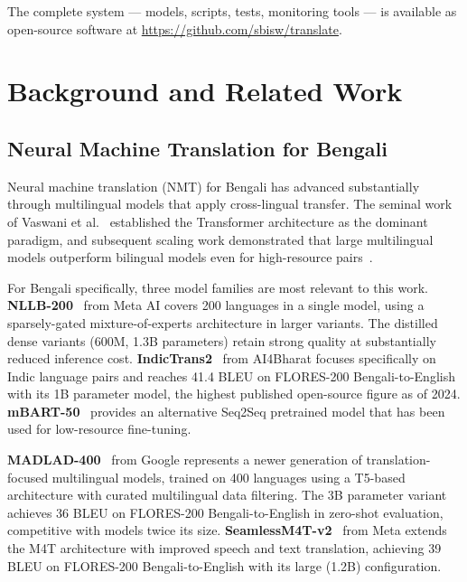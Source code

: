 \documentclass[conference]{IEEEtran}
\newcommand{\MADLADBLEU}{36}
\newcommand{\SEAMLESSBLEU}{39}
\begin{document}
The complete system --- models, scripts, tests, monitoring tools --- is available
as open-source software at \url{https://github.com/sbisw/translate}.

\section{Background and Related Work}

\subsection{Neural Machine Translation for Bengali}

Neural machine translation (NMT) for Bengali has advanced substantially through
multilingual models that apply cross-lingual transfer.
The seminal work of Vaswani et al.~\cite{vaswani2017attention} established the
Transformer architecture as the dominant paradigm, and subsequent scaling work
demonstrated that large multilingual models outperform bilingual models even for
high-resource pairs~\cite{arivazhagan2019massively}.

For Bengali specifically, three model families are most relevant to this work.
\textbf{NLLB-200}~\cite{nllb2022} from Meta AI covers 200 languages in a single model,
using a sparsely-gated mixture-of-experts architecture in larger variants.
The distilled dense variants (600M, 1.3B parameters) retain strong quality at
substantially reduced inference cost.
\textbf{IndicTrans2}~\cite{gala2023indictrans2} from AI4Bharat focuses specifically
on Indic language pairs and reaches 41.4 BLEU on FLORES-200 Bengali-to-English with
its 1B parameter model, the highest published open-source figure as of 2024.
\textbf{mBART-50}~\cite{liu2020multilingual} provides an alternative Seq2Seq
pretrained model that has been used for low-resource fine-tuning.

\textbf{MADLAD-400}~\cite{kudugunta2023madlad} from Google represents a newer
generation of translation-focused multilingual models, trained on 400 languages
using a T5-based architecture with curated multilingual data filtering.
The 3B parameter variant achieves \MADLADBLEU{} BLEU on FLORES-200 Bengali-to-English
in zero-shot evaluation, competitive with models twice its size.
\textbf{SeamlessM4T-v2}~\cite{seamlessm4t2023} from Meta extends the M4T architecture
with improved speech and text translation, achieving \SEAMLESSBLEU{} BLEU on
FLORES-200 Bengali-to-English with its large (1.2B) configuration.
\end{document}
